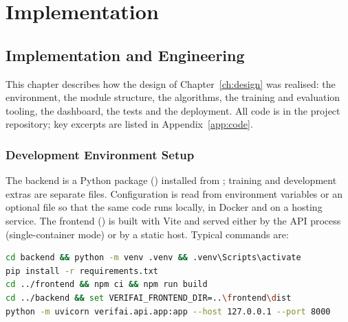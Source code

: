 \chapter{Implementation}
\label{ch:impl}

\section{Implementation and Engineering}
This chapter describes how the design of Chapter~\ref{ch:design} was realised: the environment, the module structure, the algorithms, the training
and evaluation tooling, the dashboard, the tests and the deployment. All code is in the project repository; key excerpts are listed in
Appendix~\ref{app:code}.

\subsection{Development Environment Setup}
The backend is a Python package () installed from ; training and development extras are
separate files. Configuration is read from environment variables or an optional  file so that the same code runs locally, in
Docker and on a hosting service. The frontend () is built with Vite and served either by the API process (single-container
mode) or by a static host. Typical commands are:

\begin{lstlisting}[language=bash,numbers=none,caption={Running the project locally.},label={lst:run}]
cd backend && python -m venv .venv && .venv\Scripts\activate
pip install -r requirements.txt
cd ../frontend && npm ci && npm run build
cd ../backend && set VERIFAI_FRONTEND_DIR=..\frontend\dist
python -m uvicorn verifai.api.app:app --host 127.0.0.1 --port 8000
\end{lstlisting}

